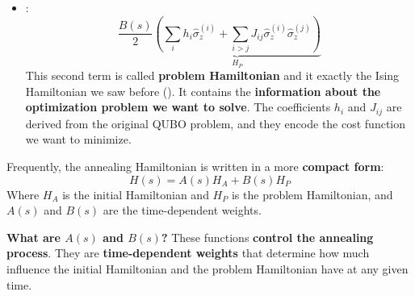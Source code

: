 \begin{itemize}
    \highspace
    Roughly speaking, the superposition state $\ket{+}$ does not correspond to a single candidate solution. Instead, it places the system in a quantum state that contains \textbf{all possible computational basis} states with equal amplitude. For $n$ qubits:
    \begin{equation*}
        \ket{+}^{\otimes n}
        =
        \frac{1}{\sqrt{2^n}}
        \sum_{x \in \{0,1\}^n} \ket{x}
    \end{equation*}
    Therefore, the system is not initially biased toward any particular solution. The transverse field generated by the Pauli-$X$ operators continuously induces spin flips and quantum fluctuations, \textbf{allowing the system to explore different regions of the energy landscape}. During the annealing process, these fluctuations are gradually reduced while the problem Hamiltonian is turned on, ideally guiding the system toward the ground state corresponding to the optimal solution.


    \item {}:
    \begin{equation*}
        \frac{B(s)}{2} \underbrace{\left( \sum_i h_i \hat{\sigma}_{z}^{(i)} + \sum_{i > j} J_{ij} \hat{\sigma}_{z}^{(i)} \hat{\sigma}_{z}^{(j)} \right)}_{H_P}
    \end{equation*}
    This second term is called \textbf{problem Hamiltonian} and it exactly the Ising Hamiltonian we saw before (). It contains the \textbf{information about the optimization problem we want to solve}. The coefficients $h_i$ and $J_{ij}$ are derived from the original QUBO problem, and they encode the cost function we want to minimize.
\end{itemize}
Frequently, the annealing Hamiltonian is written in a more \textbf{compact form}:
\begin{equation}
    H(s) = A(s) H_A + B(s) H_P
\end{equation}
Where $H_A$ is the initial Hamiltonian and $H_P$ is the problem Hamiltonian, and $A(s)$ and $B(s)$ are the time-dependent weights.

\newpage

\noindent
\textcolor{Green3}{ \textbf{What are $A(s)$ and $B(s)$?}} These functions \textbf{control the annealing process}. They are \textbf{time-dependent weights} that determine how much influence the initial Hamiltonian and the problem Hamiltonian have at any given time.

